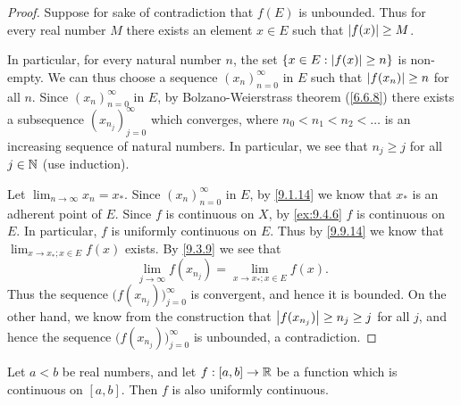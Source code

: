 \begin{proof}
  Suppose for sake of contradiction that \(f(E)\) is unbounded.
  Thus for every real number \(M\) there exists an element \(x \in E\) such that \(\left\lvert f(x)\right\rvert \geq M\).

  In particular, for every natural number \(n\), the set \(\left\lbrace x \in E : \left\lvert f(x)\right\rvert \geq n\right\rbrace\) is non-empty.
  We can thus choose a sequence \((x_n)_{n = 0}^\infty\) in \(E\) such that \(\left\lvert f(x_n)\right\rvert \geq n\) for all \(n\).
  Since \((x_n)_{n = 0}^\infty\) in \(E\), by Bolzano-Weierstrass theorem (\cref{6.6.8}) there exists a subsequence \((x_{n_j})_{j = 0}^\infty\) which converges, where \(n_0 < n_1 < n_2 < \dots\) is an increasing sequence of natural numbers.
  In particular, we see that \(n_j \geq j\) for all \(j \in \mathbb{N}\) (use induction).

  Let \(\lim_{n \to \infty} x_n = x_*\).
  Since \((x_n)_{n = 0}^\infty\) in \(E\), by \cref{9.1.14} we know that \(x_*\) is an adherent point of \(E\).
  Since \(f\) is continuous on \(X\), by \cref{ex:9.4.6} \(f\) is continuous on \(E\).
  In particular, \(f\) is uniformly continuous on \(E\).
  Thus by \cref{9.9.14} we know that \(\lim_{x \to x_* ; x \in E} f(x)\) exists.
  By \cref{9.3.9} we see that
  \[
    \lim_{j \to \infty} f(x_{n_j}) = \lim_{x \to x_* ; x \in E} f(x).
  \]
  Thus the sequence \(\big(f(x_{n_j})\big)_{j = 0}^\infty\) is convergent, and hence it is bounded.
  On the other hand, we know from the construction that \(\left\lvert f(x_{n_j})\right\rvert \geq n_j \geq j\) for all \(j\), and hence the sequence \(\big(f(x_{n_j})\big)_{j = 0}^\infty\) is unbounded, a contradiction.
\end{proof}

\begin{thm}\label{9.9.16}
  Let \(a < b\) be real numbers, and let \(f : [a, b] \to \mathbb{R}\) be a function which is continuous on \([a, b]\).
  Then \(f\) is also uniformly continuous.
\end{thm}

